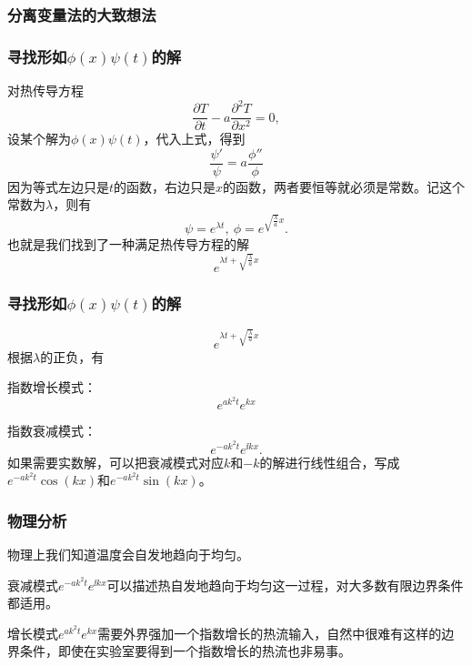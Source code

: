 \documentclass[CJK]{beamer}
\begin{document}
\begin{frame}
  \frametitle{分离变量法的大致想法}
  
  
\end{frame}


\begin{frame}
  \frametitle{寻找形如$\phi(x)\psi(t)$的解}
  
  对热传导方程
  $$ \frac{\partial T}{\partial t} - a\frac{\partial^2T}{\partial x^2} = 0,$$
  设某个解为$\phi(x)\psi(t)$，代入上式，得到
  $$\frac{\psi'}{\psi} = a\frac{\phi''}{\phi} $$
  因为等式左边只是$t$的函数，右边只是$x$的函数，两者要恒等就必须是常数。记这个常数为$\lambda $，则有
  $$ \psi = e^{\lambda t},\ \phi = e^{ \sqrt{\frac{\lambda}{a}}x}.$$
  也就是我们找到了一种满足热传导方程的解
 $$e^{\lambda t + \sqrt{\frac{\lambda}{a}}x}$$
  
\end{frame}


\begin{frame}
  \frametitle{寻找形如$\phi(x)\psi(t)$的解}
  
  $$e^{\lambda t + \sqrt{\frac{\lambda}{a}}x}$$
  根据$\lambda$的正负，有
  \bitem
  \item{
  指数增长模式：
  $$ e^{ak^2t}e^{kx} $$}
\item{指数衰减模式：
  $$ e^{-ak^2t}e^{\ii kx} .$$ }
  \eitem
  {\small 如果需要实数解，可以把衰减模式对应$k$和$-k$的解进行线性组合，写成$e^{-ak^2t}\cos{(kx)}$和$e^{-ak^2t}\sin{(kx)}$。}
  
\end{frame}

\begin{frame}
  \frametitle{物理分析}
  
  物理上我们知道温度会自发地趋向于均匀。

  \skiplines

  \bitem

  \item{\blue 衰减模式$e^{-ak^2t}e^{\ii kx}$可以描述热自发地趋向于均匀这一过程，对大多数有限边界条件都适用。}

  \item{增长模式$e^{ak^2t}e^{kx}$需要外界强加一个指数增长的热流输入，自然中很难有这样的边界条件，即使在实验室要得到一个指数增长的热流也非易事。}


    \eitem

  
  
\end{frame}
\end{document}
